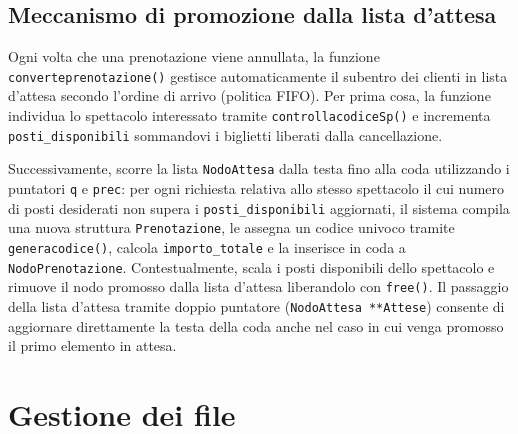 \documentclass[11pt,a4paper,oneside,openany]{book}
\begin{document}
\subsection{Meccanismo di promozione dalla lista d'attesa}
Ogni volta che una prenotazione viene annullata, la funzione \texttt{converteprenotazione()} gestisce automaticamente il subentro dei clienti in lista d'attesa secondo l'ordine di arrivo (politica FIFO). Per prima cosa, la funzione individua lo spettacolo interessato tramite \texttt{controllacodiceSp()} e incrementa \texttt{posti\_disponibili} sommandovi i biglietti liberati dalla cancellazione.

Successivamente, scorre la lista \texttt{NodoAttesa} dalla testa fino alla coda utilizzando i puntatori \texttt{q} e \texttt{prec}: per ogni richiesta relativa allo stesso spettacolo il cui numero di posti desiderati non supera i \texttt{posti\_disponibili} aggiornati, il sistema compila una nuova struttura \texttt{Prenotazione}, le assegna un codice univoco tramite \texttt{generacodice()}, calcola \texttt{importo\_totale} e la inserisce in coda a \texttt{NodoPrenotazione}. Contestualmente, scala i posti disponibili dello spettacolo e rimuove il nodo promosso dalla lista d'attesa liberandolo con \texttt{free()}. Il passaggio della lista d'attesa tramite doppio puntatore (\texttt{NodoAttesa **Attese}) consente di aggiornare direttamente la testa della coda anche nel caso in cui venga promosso il primo elemento in attesa.

\section{Gestione dei file}

\end{document}

